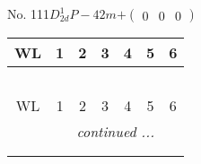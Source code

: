 \documentclass[fleqn,9pt,landscape]{jsarticle}
\begin{document}
\newpage
No. 111\quad$D_{2d}^{1}$\quad$P-42m$\quad[ tetragonal ]\quad$+\begin{pmatrix} 0 & 0 & 0 \end{pmatrix}$
\begin{center}
\renewcommand{\arraystretch}{1.2}
\begin{longtable}{ccccccc}
 \hline \hline
WL & 1 & 2 & 3 & 4 & 5 & 6 \\ \hline \endfirsthead

\multicolumn{6}{l}{\tablename\ \thetable{}} \\
 \hline \hline
WL & 1 & 2 & 3 & 4 & 5 & 6 \\ \hline \endhead

 \hline \hline
\multicolumn{6}{r}{\footnotesize\it continued ...} \\ \endfoot

 \hline \hline
\multicolumn{6}{r}{} \\ \endlastfoot


\end{longtable}
\end{center}
\end{document}
